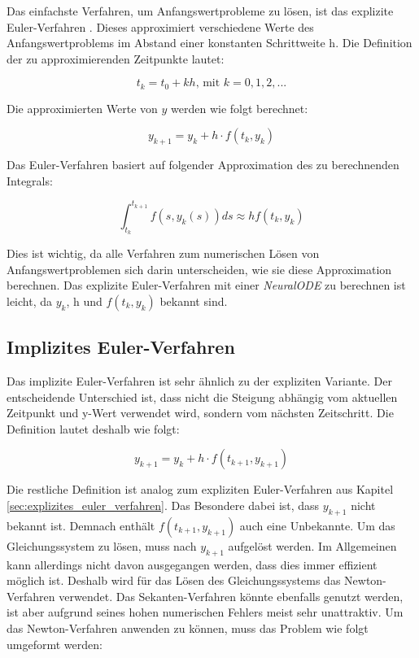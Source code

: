 
Das einfachste Verfahren, um Anfangswertprobleme zu lösen, ist das explizite Euler-Verfahren \cite[Kapitel~II.1]{ode1}.
Dieses approximiert verschiedene Werte des Anfangswertproblems 
im Abstand einer konstanten Schrittweite h.
Die Definition der zu approximierenden Zeitpunkte lautet:

$$
t_k = t_0 + kh \text{, mit } k = 0, 1, 2, ...
$$

Die approximierten Werte von $y$ werden wie folgt berechnet:

$$
y_{k + 1} = y_{k} + h \cdot f(t_k, y_k)
$$

Das Euler-Verfahren basiert auf folgender Approximation des zu berechnenden Integrals:

$$
\int_{t_k}^{t_{k+1}} f(s, y_k(s)) ds \approx h f(t_k, y_k)
$$

Dies ist wichtig, da alle Verfahren zum numerischen Lösen von Anfangswertproblemen sich darin unterscheiden, wie sie diese Approximation berechnen.
Das explizite Euler-Verfahren mit einer \textit{NeuralODE} zu berechnen
ist leicht, da $y_k$, h und $f(t_k, y_k)$ bekannt sind.


\subsection{Implizites Euler-Verfahren}

Das implizite Euler-Verfahren  \cite[Kapitel~II.7]{ode1} ist sehr ähnlich zu der expliziten Variante.
Der entscheidende Unterschied ist, dass nicht die Steigung abhängig vom aktuellen 
Zeitpunkt und y-Wert verwendet wird, sondern vom nächsten Zeitschritt.
Die Definition lautet deshalb wie folgt:

$$
y_{k + 1} = y_k + h \cdot f(t_{k + 1}, y_{k + 1})
$$

Die restliche Definition ist analog zum expliziten Euler-Verfahren aus Kapitel \ref{sec:explizites_euler_verfahren}.
Das Besondere dabei ist, dass $y_{k + 1}$ nicht bekannt ist.
Demnach enthält $f(t_{k + 1}, y_{k + 1})$ auch eine Unbekannte.
Um das Gleichungssystem zu lösen, muss nach $y_{k + 1}$ aufgelöst werden.
Im Allgemeinen kann allerdings nicht davon ausgegangen werden, dass dies immer effizient möglich ist.
Deshalb wird für das Lösen des Gleichungssystems das Newton-Verfahren \cite[Kapitel~5.5]{intorduction_to_numerical_analysis} verwendet.
Das Sekanten-Verfahren \cite[Kaptiel~18.2]{HankeBourgeois.2002} könnte ebenfalls genutzt werden, ist aber aufgrund seines hohen numerischen 
Fehlers meist sehr unattraktiv.
Um das Newton-Verfahren anwenden zu können, muss das Problem wie folgt umgeformt werden:


